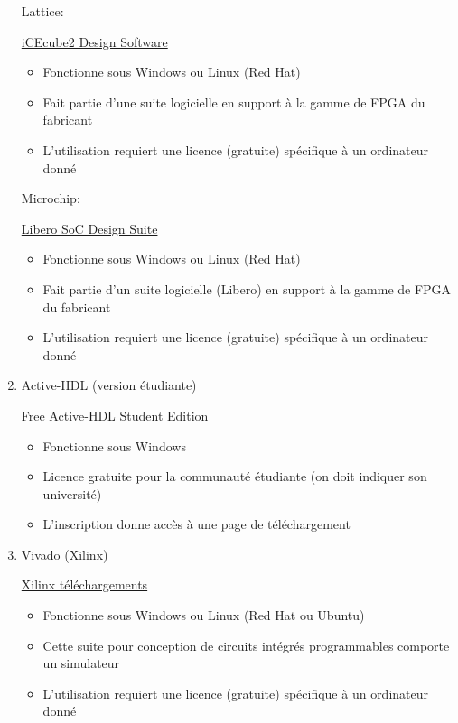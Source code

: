 \documentclass[letter, oneside]{book}
\begin{document}
\begin{enumerate}
Lattice:

\href{http://www.latticesemi.com/icecube2}{iCEcube2 Design Software}

\begin{itemize}
\item Fonctionne sous Windows ou Linux (Red Hat)
\item Fait partie d'une suite logicielle en support à la gamme de FPGA du
fabricant
\item L'utilisation requiert une licence (gratuite) spécifique à un
ordinateur donné
\end{itemize}

Microchip:

\href{https://www.microchip.com/en-us/products/fpgas-and-plds/fpga-and-soc-design-tools/fpga/libero-software-later-versions\#downloads}{Libero SoC Design Suite}

\begin{itemize}
\item Fonctionne sous Windows ou Linux (Red Hat)
\item Fait partie d'un suite logicielle (Libero) en support à la gamme de
FPGA du fabricant
\item L'utilisation requiert une licence (gratuite) spécifique à un
ordinateur donné
\end{itemize}

\item Active-HDL (version étudiante)
\label{sec:orgfd6b183}

\href{https://www.aldec.com/en/products/fpga\_simulation/active\_hdl\_student}{Free Active-HDL Student Edition}

\begin{itemize}
\item Fonctionne sous Windows
\item Licence gratuite pour la communauté étudiante (on doit indiquer son université)
\item L'inscription donne accès à une page de téléchargement
\end{itemize}

\item Vivado (Xilinx)
\label{sec:org6e13290}

\href{https://www.xilinx.com/support/download.html}{Xilinx téléchargements}

\begin{itemize}
\item Fonctionne sous Windows ou Linux (Red Hat ou Ubuntu)
\item Cette suite pour conception de circuits intégrés programmables
comporte un simulateur
\item L'utilisation requiert une licence (gratuite) spécifique à un
ordinateur donné
\end{itemize}


\end{enumerate}
\end{document}
